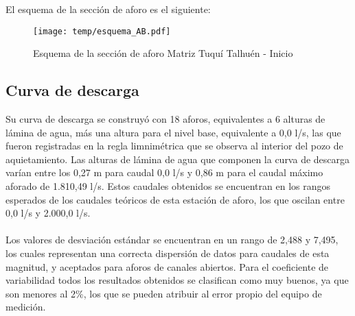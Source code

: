 \documentclass[]{article}
\begin{document}
El esquema de la sección de aforo es el siguiente:

\begin{figure}[H]
  \centering
  \texttt{[image: temp/esquema\_AB.pdf]}
\caption{Esquema de la sección de aforo Matriz Tuquí Talhuén - Inicio}
\label{fig:Esquema_AB}
\end{figure}

\subsection{Curva de descarga}\label{curva-de-descarga-1}

Su curva de descarga se construyó con 18 aforos, equivalentes a 6 alturas de lámina de agua, más una altura para el nivel base, equivalente a 0,0 l/s, las que fueron registradas en la regla limnimétrica que se observa al interior del pozo de aquietamiento. Las alturas de lámina de agua que componen la curva de descarga varían entre los 0,27 m para caudal 0,0 l/s y 0,86 m para el caudal máximo aforado de 1.810,49 l/s. Estos caudales obtenidos se encuentran en los rangos esperados de los caudales teóricos de esta estación de aforo, los que oscilan entre 0,0 l/s y 2.000,0 l/s.\\
\\
Los valores de desviación estándar se encuentran en un rango de 2,488 y 7,495, los cuales representan una correcta dispersión de datos para caudales de esta magnitud, y aceptados para aforos de canales abiertos. Para el coeficiente de variabilidad todos los resultados obtenidos se clasifican como muy buenos, ya que son menores al 2\%, los que se pueden atribuir al error propio del equipo de medición.
\end{document}
